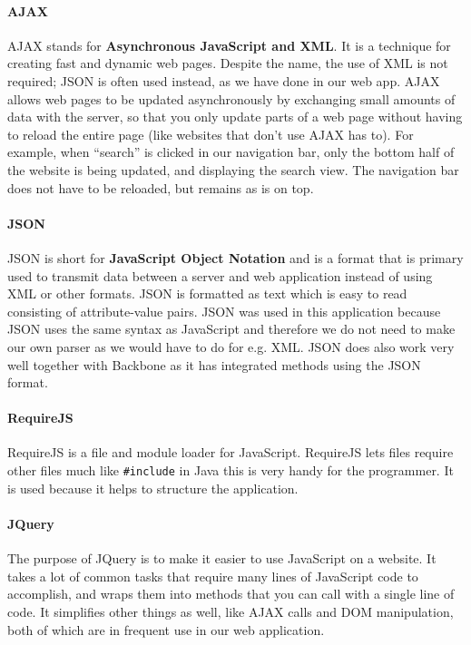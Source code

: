 \paragraph{AJAX}
AJAX\cite{web_3} stands for \textbf{Asynchronous JavaScript and XML}. It is a technique for creating fast and dynamic web pages. Despite the name, the use of XML is not required; JSON is often used instead, as we have done in our web app. AJAX allows web pages to be updated asynchronously by exchanging small amounts of data with the server, so that you only update parts of a web page without having to reload the entire page (like websites that don’t use AJAX has to). For example, when “search” is clicked in our navigation bar, only the bottom half of the website is being updated, and displaying the search view. The navigation bar does not have to be reloaded, but remains as is on top.

\paragraph{JSON}
JSON\cite{web_4} is short for \textbf{JavaScript Object Notation} and is a format that is primary used to transmit data between a server and web application instead of using XML or other formats.
JSON is formatted as text which is easy to read consisting of attribute-value pairs.
JSON was used in this application because JSON uses the same syntax as JavaScript and therefore we do not need to make our own parser as we would have to do for e.g. XML. JSON does also work very well together with Backbone as it has integrated methods using the JSON format.

\paragraph{RequireJS}
RequireJS\cite{web_5} is a file and module loader for JavaScript. RequireJS lets files require other files much like \texttt{\#include} in Java this is very handy for the programmer. It is used because it helps to structure the application.
\paragraph{JQuery}
The purpose of JQuery\cite{web_6} is to make it easier to use JavaScript on a website. It takes a lot of common tasks that require many lines of JavaScript code to accomplish, and wraps them into methods that you can call with a single line of code. It simplifies other things as well, like AJAX calls and DOM manipulation, both of which are in frequent use in our web application.
